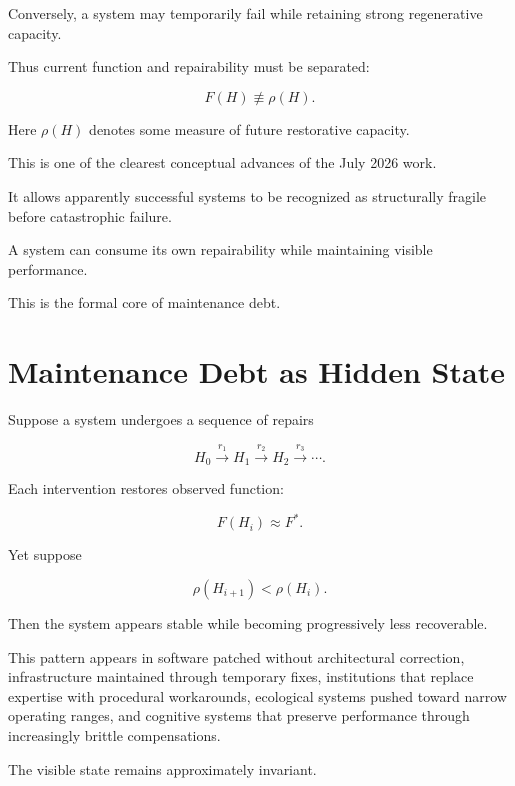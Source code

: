 \documentclass[11pt]{article}
\theoremstyle{remark}
\begin{document}
Conversely, a system may temporarily fail while retaining strong regenerative capacity.

Thus current function and repairability must be separated:

\begin{equation}
F(H)
\not\equiv
\rho(H).
\end{equation}

Here $\rho(H)$ denotes some measure of future restorative capacity.

This is one of the clearest conceptual advances of the July 2026 work.

It allows apparently successful systems to be recognized as structurally fragile before catastrophic failure.

A system can consume its own repairability while maintaining visible performance.

This is the formal core of maintenance debt.

\section{Maintenance Debt as Hidden State}

Suppose a system undergoes a sequence of repairs

\begin{equation}
H_0
\xrightarrow{r_1}
H_1
\xrightarrow{r_2}
H_2
\xrightarrow{r_3}
\cdots.
\end{equation}

Each intervention restores observed function:

\begin{equation}
F(H_i)\approx F^\ast.
\end{equation}

Yet suppose

\begin{equation}
\rho(H_{i+1})<\rho(H_i).
\end{equation}

Then the system appears stable while becoming progressively less recoverable.

This pattern appears in software patched without architectural correction, infrastructure maintained through temporary fixes, institutions that replace expertise with procedural workarounds, ecological systems pushed toward narrow operating ranges, and cognitive systems that preserve performance through increasingly brittle compensations.

The visible state remains approximately invariant.
\end{document}
